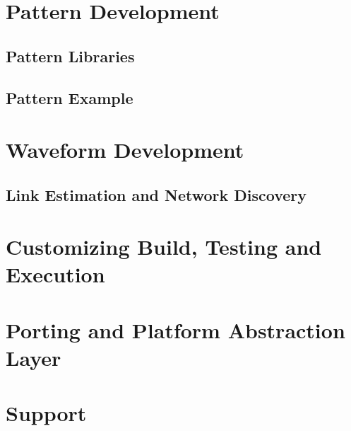 \documentclass[letterpaper,
 12pt,
 titlepage,
 oneside,
 openany,			%
 headinclude,    %
 headsepline,    %
 footsepline=false, %
 appendixprefix=true,
 chapterprefix=true,   
 index= totoc,        %
 bibliography=openstyle,
 bibliography    = totoc         %
]{book}
\newcommand{\+}{\discretionary{\mbox{\scriptsize$\hookleftarrow$}}{}{}}
\begin{document}
\chapter{Pattern Development}
\label{Chap:Pattern}

\section{Pattern Libraries}

\section{Pattern Example}


\chapter{Waveform Development}
\label{Chap:Waveform}

\section {Link Estimation and Network Discovery}
\label{Chap:Estimation}


\chapter{Customizing Build, Testing and Execution}
\label{Chap:Exec}



\chapter{Porting and Platform Abstraction Layer}


\chapter{Support}
\label{Chap:Support}








\end{document}
